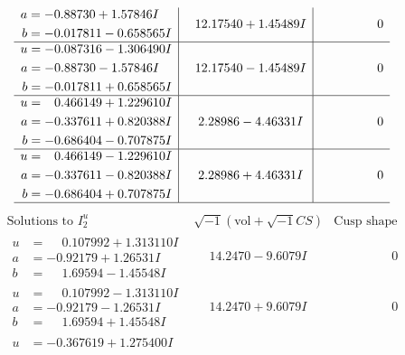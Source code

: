 \documentclass[1p]{elsarticle_modified}
\theoremstyle{definition}
\newcommand{\I}{\sqrt{-1}}
\begin{document}
$$\begin{array}{c|c|c}
\begin{aligned}
a &= -0.88730 + 1.57846 I \\
b &= -0.017811 - 0.658565 I\end{aligned}
 & \phantom{-}12.17540 + 1.45489 I & \phantom{-0.000000 } 0 \\ \hline\begin{aligned}
u &= -0.087316 - 1.306490 I \\
a &= -0.88730 - 1.57846 I \\
b &= -0.017811 + 0.658565 I\end{aligned}
 & \phantom{-}12.17540 - 1.45489 I & \phantom{-0.000000 } 0 \\ \hline\begin{aligned}
u &= \phantom{-}0.466149 + 1.229610 I \\
a &= -0.337611 + 0.820388 I \\
b &= -0.686404 - 0.707875 I\end{aligned}
 & \phantom{-}2.28986 - 4.46331 I & \phantom{-0.000000 } 0 \\ \hline\begin{aligned}
u &= \phantom{-}0.466149 - 1.229610 I \\
a &= -0.337611 - 0.820388 I \\
b &= -0.686404 + 0.707875 I\end{aligned}
 & \phantom{-}2.28986 + 4.46331 I & \phantom{-0.000000 } 0\\
 \hline 
 \end{array}$$\newpage$$\begin{array}{c|c|c}  
\text{Solutions to }I^u_{2}& \I (\text{vol} + \sqrt{-1}CS) & \text{Cusp shape}\\
 \hline 
\begin{aligned}
u &= \phantom{-}0.107992 + 1.313110 I \\
a &= -0.92179 + 1.26531 I \\
b &= \phantom{-}1.69594 - 1.45548 I\end{aligned}
 & \phantom{-}14.2470 - 9.6079 I & \phantom{-0.000000 } 0 \\ \hline\begin{aligned}
u &= \phantom{-}0.107992 - 1.313110 I \\
a &= -0.92179 - 1.26531 I \\
b &= \phantom{-}1.69594 + 1.45548 I\end{aligned}
 & \phantom{-}14.2470 + 9.6079 I & \phantom{-0.000000 } 0 \\ \hline\begin{aligned}
u &= -0.367619 + 1.275400 I \\

\end{aligned}
\end{array}$$
\end{document}
